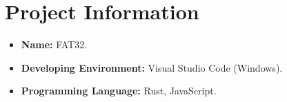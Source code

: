 \section{Project Information}
\begin{itemize}
  \item \textbf{Name:} FAT32.
  \item \textbf{Developing Environment:} Visual Studio Code (Windows).
  \item \textbf{Programming Language:} Rust, JavaScript.
\end{itemize}
